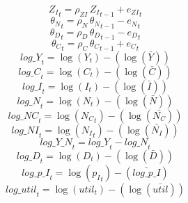 \begin{dmath}
{{Z_I}}_{t}={{\rho_{ZI}}}\, {{Z_I}}_{t-1}+{{e_{ZI}}}_{t}
\end{dmath}
\begin{dmath}
{{\theta_N}}_{t}={{\rho_N}}\, {{\theta_N}}_{t-1}-{{e_N}}_{t}
\end{dmath}
\begin{dmath}
{{\theta_D}}_{t}={{\rho_D}}\, {{\theta_D}}_{t-1}-{{e_D}}_{t}
\end{dmath}
\begin{dmath}
{{\theta_C}}_{t}={{\rho_C}}\, {{\theta_C}}_{t-1}+{{e_C}}_{t}
\end{dmath}
\begin{dmath}
{log\_Y}_{t}=\log\left({{Y}}_{t}\right)-(\log\left(\bar{{Y}}\right))
\end{dmath}
\begin{dmath}
{log\_C}_{t}=\log\left({{C}}_{t}\right)-(\log\left(\bar{{C}}\right))
\end{dmath}
\begin{dmath}
{log\_I}_{t}=\log\left({{I}}_{t}\right)-(\log\left(\bar{{I}}\right))
\end{dmath}
\begin{dmath}
{log\_N}_{t}=\log\left({{N}}_{t}\right)-(\log\left(\bar{{N}}\right))
\end{dmath}
\begin{dmath}
{log\_NC}_{t}=\log\left({{N_C}}_{t}\right)-(\log\left(\bar{{N_C}}\right))
\end{dmath}
\begin{dmath}
{log\_NI}_{t}=\log\left({{N_I}}_{t}\right)-(\log\left(\bar{{N_I}}\right))
\end{dmath}
\begin{dmath}
{log\_Y\_N}_{t}={log\_Y}_{t}-{log\_N}_{t}
\end{dmath}
\begin{dmath}
{log\_D}_{t}=\log\left({{D}}_{t}\right)-(\log\left(\bar{{D}}\right))
\end{dmath}
\begin{dmath}
{log\_p\_I}_{t}=\log\left({{p_I}}_{t}\right)-(\bar{log\_p\_I})
\end{dmath}
\begin{dmath}
{log\_util}_{t}=\log\left({{util}}_{t}\right)-(\log\left(\bar{{util}}\right))
\end{dmath}
